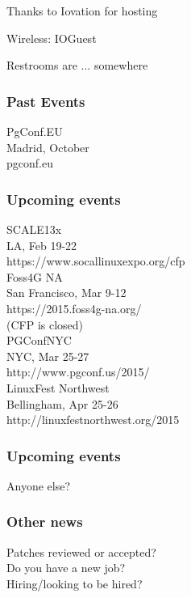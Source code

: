 \documentclass{beamer}
\begin{document}

\frame
{
  \begin{center}
  \item[]Thanks to Iovation for hosting
  \item[]Wireless: IOGuest
  \item[]Restrooms are ... somewhere
  \end{center}
}

\frame
{
  \frametitle{Past Events}
  \begin{center}
{\large PgConf.EU\\}
Madrid, October\\
pgconf.eu
  \end{center}
}

\frame
{
  \frametitle{Upcoming events}
  \begin{center}
{\large SCALE13x\\}
LA, Feb 19-22\\
https://www.socallinuxexpo.org/cfp\\
\vspace{5 mm}
{\large Foss4G NA\\}
San Francisco, Mar 9-12\\
https://2015.foss4g-na.org/\\
(CFP is closed)\\
\vspace{5 mm}
{\large PGConfNYC\\}
NYC, Mar 25-27\\
http://www.pgconf.us/2015/\\
\vspace{5 mm}
{\large LinuxFest Northwest\\}
Bellingham, Apr 25-26\\
http://linuxfestnorthwest.org/2015\\
  \end{center}
}

\frame
{
  \frametitle{Upcoming events}
  \begin{center}
Anyone else?
  \end{center}
}

\frame
{
  \frametitle{Other news}
  \begin{center}
Patches reviewed or accepted?\\
Do you have a new job?\\
Hiring/looking to be hired?\\
  \end{center}
}
\end{document}
